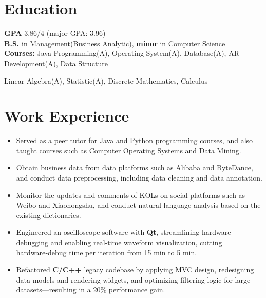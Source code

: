 \documentclass{resume}
\begin{document}



\section{Education}
\textbf{GPA} 3.86/4 (major GPA: 3.96)
\\ \textbf{B.S.} in Management(Business Analytic),\textbf{ minor} in Computer Science
\\ \textbf{Courses:} Java Programming(A), Operating System(A), Database(A), AR Development(A), Data Structure

\hspace{1.5cm} Linear Algebra(A), Statistic(A), Discrete Mathematics, Calculus
 


\section{Work Experience}
\begin{itemize}
  \item Served as a peer tutor for Java and Python programming courses, and also taught courses such as Computer Operating Systems and Data Mining.
\end{itemize}


\begin{itemize}
  \item Obtain business data from data platforms such as Alibaba and ByteDance, and conduct data preprocessing, including data cleaning and data annotation.
  \item Monitor the updates and comments of KOLs on social platforms such as Weibo and Xiaohongshu, and conduct natural language analysis based on the existing dictionaries.
\end{itemize}

\begin{itemize}
  \item Engineered an oscilloscope software with \textbf{Qt}, streamlining hardware debugging and enabling real-time waveform visualization, cutting hardware‑debug time per iteration from 15 min to 5 min.
  \item Refactored \textbf{C/C++} legacy codebase by applying MVC design, redesigning data models and rendering widgets, and optimizing filtering logic for large datasets—resulting in a 20\% performance gain.
\end{itemize}
\end{document}
